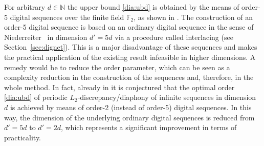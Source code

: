 \documentclass[12pt, a4paper]{article}
\newcommand{\NN}{{\mathbb{N}}} %
\begin{document}
For arbitrary $d \in \NN$ the upper bound \eqref{dia:ubd} is obtained by the means of order-5 digital sequences over the finite field $\mathbb{F}_2$, as shown in \cite{P23}. The construction of an order-5 digital sequence is based on an ordinary digital sequence in the sense of Niederreiter~\cite{N87} in dimension $d'=5d$ via a procedure called interlacing (see Section~\ref{sec:dignet}). This is a major disadvantage of these sequences and makes the practical application of the existing result infeasible in higher dimensions. A remedy would be to reduce the order parameter, which can be seen as a complexity reduction in the construction of the sequences and, therefore, in the whole method. In fact, already in \cite{P23} it is conjectured that the optimal order \eqref{dia:ubd} of periodic $L_2$-discrepancy/diaphony of infinite sequences in dimension $d$ is achieved by means of order-2 (instead of order-5) digital sequences. In this way, the dimension of the underlying ordinary digital sequences is reduced from $d'=5 d$ to $d'=2 d$, which represents a significant improvement in terms of practicality.
\end{document}
